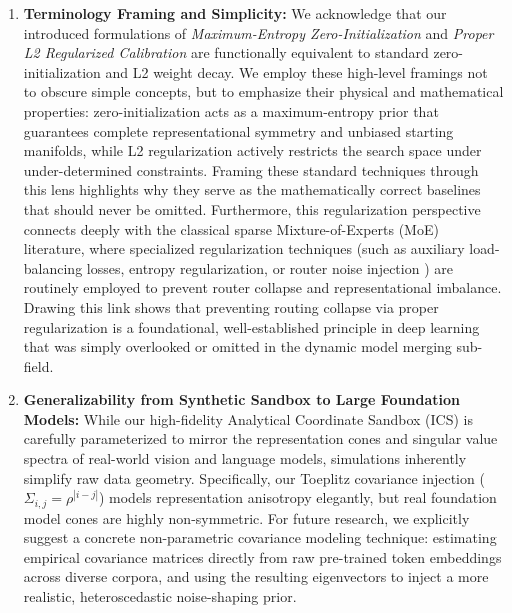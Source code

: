 \begin{enumerate}
    \item \textbf{Terminology Framing and Simplicity:} We acknowledge that our introduced formulations of \emph{Maximum-Entropy Zero-Initialization} and \emph{Proper L2 Regularized Calibration} are functionally equivalent to standard zero-initialization and L2 weight decay. We employ these high-level framings not to obscure simple concepts, but to emphasize their physical and mathematical properties: zero-initialization acts as a maximum-entropy prior that guarantees complete representational symmetry and unbiased starting manifolds, while L2 regularization actively restricts the search space under under-determined constraints. Framing these standard techniques through this lens highlights why they serve as the mathematically correct baselines that should never be omitted. Furthermore, this regularization perspective connects deeply with the classical sparse Mixture-of-Experts (MoE) literature, where specialized regularization techniques (such as auxiliary load-balancing losses, entropy regularization, or router noise injection \citep{shazeer2017outrageously}) are routinely employed to prevent router collapse and representational imbalance. Drawing this link shows that preventing routing collapse via proper regularization is a foundational, well-established principle in deep learning that was simply overlooked or omitted in the dynamic model merging sub-field.
    
    \item \textbf{Generalizability from Synthetic Sandbox to Large Foundation Models:} While our high-fidelity Analytical Coordinate Sandbox (ICS) is carefully parameterized to mirror the representation cones and singular value spectra of real-world vision and language models, simulations inherently simplify raw data geometry. Specifically, our Toeplitz covariance injection ($\Sigma_{i,j} = \rho^{|i-j|}$) models representation anisotropy elegantly, but real foundation model cones are highly non-symmetric. For future research, we explicitly suggest a concrete non-parametric covariance modeling technique: estimating empirical covariance matrices directly from raw pre-trained token embeddings across diverse corpora, and using the resulting eigenvectors to inject a more realistic, heteroscedastic noise-shaping prior.
    

\end{enumerate}
